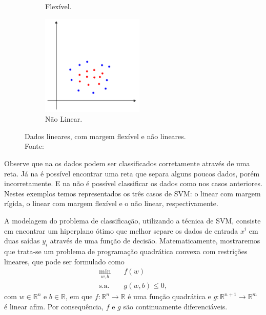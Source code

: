 \documentclass[12pt,a4paper]{scrartcl}
\def\RR{\mathds{R}}
\theoremstyle{definition}%
\begin{document}
\begin{figure}[!h]
\begin{subfigure}[!h]{0.3\textwidth}
	\caption{Flexível. \label{fig1:b}}
\end{subfigure}
\begin{subfigure}[!h]{0.3\textwidth}
	\centering
	\includegraphics[width=\textwidth]{SVM_naolinear}
	\caption{Não Linear. \label{fig1:c}}
\end{subfigure}
\caption{Dados lineares, com margem flexível e não lineares. \label{fig1}\\ Fonte: \textcite{Evelin2017}}
\end{figure}

Observe que na  os dados podem ser classificados corretamente através de uma reta. Já na  é possível encontrar uma reta que separa alguns poucos dados, porém incorretamente. E na  não é possível classificar os dados como nos casos anteriores. Nestes exemplos temos representados os três casos de SVM: o linear com margem rígida, o linear com margem flexível e o não linear, respectivamente.

A modelagem do problema de classificação, utilizando a técnica de SVM, consiste em encontrar um hiperplano ótimo que melhor separe os dados de entrada $x^i$ em duas saídas $y_i$ através de uma função de decisão. Matematicamente, mostraremos que trata-se um problema de programação quadrática convexa com restrições lineares, que pode ser formulado como
\[
\begin{aligned}
\min_{w,b} & \quad f(w) \\
\text{s.a.} &  \quad g(w,b) \leq 0, \end{aligned}
\]
com $w\in \RR^n$ e $b\in \RR $, em que $f: \RR^n \rightarrow \RR$ é uma função quadrática e $g: \RR^{n+1} \rightarrow \RR^m$ é linear afim. Por consequência, $f$ e $g$ são continuamente diferenciáveis.
\end{document}
